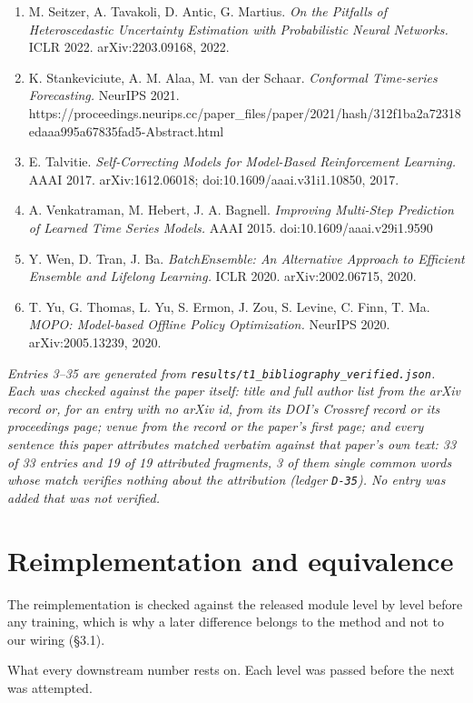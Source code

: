 \documentclass[10pt]{article}
\begin{document}
\begin{enumerate}
\item M. Seitzer, A. Tavakoli, D. Antic, G. Martius. \emph{On the Pitfalls of Heteroscedastic Uncertainty Estimation with Probabilistic Neural Networks.} ICLR 2022. arXiv:2203.09168, 2022.
\item K. Stankeviciute, A. M. Alaa, M. van der Schaar. \emph{Conformal Time-series Forecasting.} NeurIPS 2021. https://proceedings.neurips.cc/paper\_files/paper/2021/hash/312f1ba2a72318edaaa995a67835fad5-Abstract.html
\item E. Talvitie. \emph{Self-Correcting Models for Model-Based Reinforcement Learning.} AAAI 2017. arXiv:1612.06018; doi:10.1609/aaai.v31i1.10850, 2017.
\item A. Venkatraman, M. Hebert, J. A. Bagnell. \emph{Improving Multi-Step Prediction of Learned Time Series Models.} AAAI 2015. doi:10.1609/aaai.v29i1.9590
\item Y. Wen, D. Tran, J. Ba. \emph{BatchEnsemble: An Alternative Approach to Efficient Ensemble and Lifelong Learning.} ICLR 2020. arXiv:2002.06715, 2020.
\item T. Yu, G. Thomas, L. Yu, S. Ermon, J. Zou, S. Levine, C. Finn, T. Ma. \emph{MOPO: Model-based Offline Policy Optimization.} NeurIPS 2020. arXiv:2005.13239, 2020.
\end{enumerate}

\emph{Entries 3--35 are generated from \texttt{results/\allowbreak{}t1\_\allowbreak{}bibliography\_\allowbreak{}verified\allowbreak{}.json}. Each was checked against the paper itself: title and full author list from the arXiv record or, for an entry with no arXiv id, from its DOI's Crossref record or its proceedings page; venue from the record or the paper's first page; and every sentence this paper attributes matched verbatim against that paper's own text: 33 of 33 entries and 19 of 19 attributed fragments, 3 of them single common words whose match verifies nothing about the attribution (ledger \texttt{D-35}). No entry was added that was not verified.}

\appendix
\section{Reimplementation and equivalence}

The reimplementation is checked against the released module level by level before any training, which is why a later difference belongs to the method and not to our wiring (\S{}3.1).

What every downstream number rests on. Each level was passed before the next was attempted.
\end{document}
